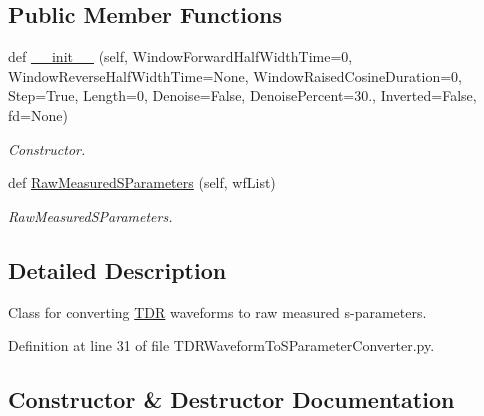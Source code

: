 \subsection*{Public Member Functions}
\begin{DoxyCompactItemize}
\item 
def \hyperlink{classSignalIntegrity_1_1Measurement_1_1TDR_1_1TDRWaveformToSParameterConverter_1_1TDRWaveformToSParameterConverter_a85d11b8192fdd839d48a2d7e1abf4a5d}{\+\_\+\+\_\+init\+\_\+\+\_\+} (self, Window\+Forward\+Half\+Width\+Time=0, Window\+Reverse\+Half\+Width\+Time=None, Window\+Raised\+Cosine\+Duration=0, Step=True, Length=0, Denoise=False, Denoise\+Percent=30., Inverted=False, fd=None)
\begin{DoxyCompactList}\small\item\em Constructor. \end{DoxyCompactList}\item 
def \hyperlink{classSignalIntegrity_1_1Measurement_1_1TDR_1_1TDRWaveformToSParameterConverter_1_1TDRWaveformToSParameterConverter_a6ff074fa355062d77a954060b9107410}{Raw\+Measured\+S\+Parameters} (self, wf\+List)
\begin{DoxyCompactList}\small\item\em Raw\+Measured\+S\+Parameters. \end{DoxyCompactList}\end{DoxyCompactItemize}


\subsection{Detailed Description}
Class for converting \hyperlink{namespaceSignalIntegrity_1_1Measurement_1_1TDR}{T\+DR} waveforms to raw measured s-\/parameters. 

Definition at line 31 of file T\+D\+R\+Waveform\+To\+S\+Parameter\+Converter.\+py.



\subsection{Constructor \& Destructor Documentation}
\mbox{\label{classSignalIntegrity_1_1Measurement_1_1TDR_1_1TDRWaveformToSParameterConverter_1_1TDRWaveformToSParameterConverter_a85d11b8192fdd839d48a2d7e1abf4a5d}} 
